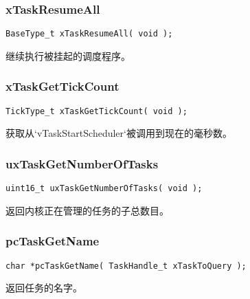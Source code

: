 \documentclass[12pt, a4paper]{article}
\begin{document}
\subsubsection {xTaskResumeAll}

\begin{lstlisting}[language={[ANSI]C},keywordstyle=\color{blue!70},commentstyle=\color{red!50!green!50!blue!50},frame=shadowbox, rulesepcolor=\color{red!20!green!20!blue!20}]
BaseType_t xTaskResumeAll( void );
\end{lstlisting}

继续执行被挂起的调度程序。

\subsubsection {xTaskGetTickCount}

\begin{lstlisting}[language={[ANSI]C},keywordstyle=\color{blue!70},commentstyle=\color{red!50!green!50!blue!50},frame=shadowbox, rulesepcolor=\color{red!20!green!20!blue!20}]
TickType_t xTaskGetTickCount( void );
\end{lstlisting}

获取从`vTaskStartScheduler`被调用到现在的毫秒数。

\subsubsection {uxTaskGetNumberOfTasks}

\begin{lstlisting}[language={[ANSI]C},keywordstyle=\color{blue!70},commentstyle=\color{red!50!green!50!blue!50},frame=shadowbox, rulesepcolor=\color{red!20!green!20!blue!20}]
uint16_t uxTaskGetNumberOfTasks( void );
\end{lstlisting}

返回内核正在管理的任务的子总数目。

\subsubsection {pcTaskGetName}

\begin{lstlisting}[language={[ANSI]C},keywordstyle=\color{blue!70},commentstyle=\color{red!50!green!50!blue!50},frame=shadowbox, rulesepcolor=\color{red!20!green!20!blue!20}]
char *pcTaskGetName( TaskHandle_t xTaskToQuery );
\end{lstlisting}

返回任务的名字。
\end{document}
